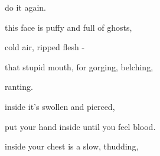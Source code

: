 \documentclass[extrafontsizes, 48pt]{memoir}
\newcommand\blankpage{%
    \null
    \thispagestyle{empty}%
    \addtocounter{page}{-1}%
    \newpage}
\begin{document}
	\begin{minipage}{.6\textwidth}
	do it again.
	\afterpage{\blankpage}
	\end{minipage}
	\newpage

	\begin{minipage}{.6\textwidth}
	this face is puffy and full of ghosts,
	\end{minipage}
	\newpage

	\begin{minipage}{.6\textwidth}
	cold air, ripped flesh - 
	\afterpage{\blankpage}
	\end{minipage}
	\newpage

	\begin{minipage}{.6\textwidth}
	that stupid mouth, for gorging, belching,
	\end{minipage}
	\newpage

	\begin{minipage}{.6\textwidth}
	ranting.
	\end{minipage}
	\newpage

	\begin{minipage}{.6\textwidth}
	inside it's swollen and pierced,
	\end{minipage}
	\newpage

	\begin{minipage}{.6\textwidth}
	put your hand inside until you feel blood.
	\afterpage{\blankpage}
	\end{minipage}
	\newpage

	\begin{minipage}{.6\textwidth}
	inside your chest is a slow, thudding, 
	\end{minipage}
	\newpage
\end{document}
